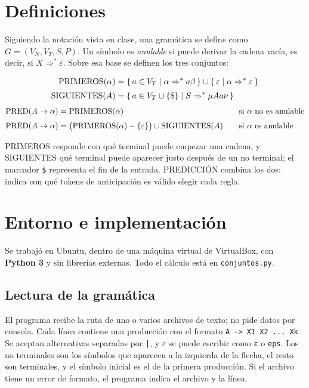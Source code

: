 \documentclass[12pt,letterpaper]{article}
\newcommand{\tk}[1]{\texttt{#1}}
\newcommand{\prim}{\textup{PRIMEROS}}
\newcommand{\sig}{\textup{SIGUIENTES}}
\newcommand{\pred}{\textup{PRED}}
\begin{document}
\section{Definiciones}

Siguiendo la notación vista en clase, una gramática se define como $G = (V_N, V_T, S, P)$. Un símbolo es \emph{anulable} si puede derivar la cadena vacía, es decir, si $X \Rightarrow^* \varepsilon$. Sobre esa base se definen los tres conjuntos:

\begin{align*}
\prim(\alpha) &= \{\, a \in V_T \mid \alpha \Rightarrow^* a\beta \,\} \cup \{\, \varepsilon \mid \alpha \Rightarrow^* \varepsilon \,\} \\[2pt]
\sig(A) &= \{\, a \in V_T \cup \{\$\} \mid S \Rightarrow^* \mu A a \nu \,\}
\end{align*}
\begin{alignat*}{2}
\pred(A \rightarrow \alpha) &= \prim(\alpha) &\quad& \text{si $\alpha$ no es anulable}\\[2pt]
\pred(A \rightarrow \alpha) &= \big(\prim(\alpha) - \{\varepsilon\}\big) \cup \sig(A) &\quad& \text{si $\alpha$ es anulable}
\end{alignat*}

PRIMEROS responde con qué terminal puede empezar una cadena, y SIGUIENTES qué terminal puede aparecer justo después de un no terminal; el marcador \tk{\$} representa el fin de la entrada. PREDICCIÓN combina los dos: indica con qué tokens de anticipación es válido elegir cada regla.

\section{Entorno e implementación}

Se trabajó en Ubuntu, dentro de una máquina virtual de VirtualBox, con \textbf{Python 3} y sin librerías externas. Todo el cálculo está en \tk{conjuntos.py}.

\subsection{Lectura de la gramática}

El programa recibe la ruta de uno o varios archivos de texto; no pide datos por consola. Cada línea contiene una producción con el formato \tk{A -> X1 X2 ... Xk}. Se aceptan alternativas separadas por \tk{|}, y $\varepsilon$ se puede escribir como \tk{ε} o \tk{eps}. Los no terminales son los símbolos que aparecen a la izquierda de la flecha, el resto son terminales, y el símbolo inicial es el de la primera producción. Si el archivo tiene un error de formato, el programa indica el archivo y la línea.
\end{document}
